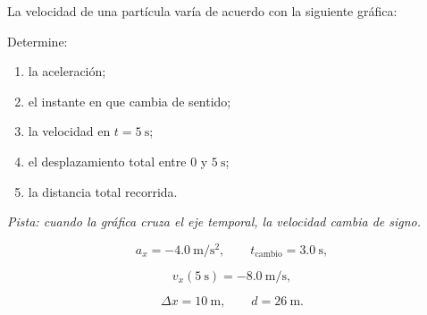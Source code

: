 \begin{ejercicio}
La velocidad de una partícula varía de acuerdo con la siguiente gráfica:

\begin{center}
\end{center}

Determine:

\begin{enumerate}[label=\alph*)]
    \item la aceleración;
    \item el instante en que cambia de sentido;
    \item la velocidad en \(t=\SI{5}{\second}\);
    \item el desplazamiento total entre \(0\) y \(\SI{5}{\second}\);
    \item la distancia total recorrida.
\end{enumerate}

\textit{Pista: cuando la gráfica cruza el eje temporal, la velocidad cambia de signo.}
\end{ejercicio}

\begin{respuesta}
\[
a_x=-\SI{4.0}{\meter\per\second\squared},
\qquad
t_{\mathrm{cambio}}=\SI{3.0}{\second},
\]

\[
v_x(\SI{5}{\second})=-\SI{8.0}{\meter\per\second},
\]

\[
\Delta x=\SI{10}{\meter},
\qquad
d=\SI{26}{\meter}.
\]
\end{respuesta}

